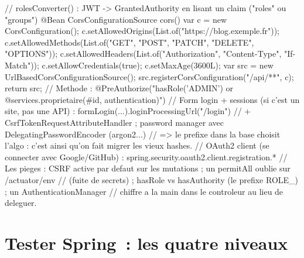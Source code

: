 \begin{codejava}
{    // rolesConverter() : JWT -> GrantedAuthority en lisant un claim ("roles" ou "groups")
    @Bean
    CorsConfigurationSource cors() {
        var c = new CorsConfiguration();
        c.setAllowedOrigins(List.of("https://blog.exemple.fr"));
        c.setAllowedMethods(List.of("GET", "POST", "PATCH", "DELETE", "OPTIONS"));
        c.setAllowedHeaders(List.of("Authorization", "Content-Type", "If-Match"));
        c.setAllowCredentials(true); c.setMaxAge(3600L);
        var src = new UrlBasedCorsConfigurationSource(); src.registerCorsConfiguration("/api/**", c); return src;
    }
}
// Methode : @PreAuthorize("hasRole('ADMIN') or @services.proprietaire(#id, authentication)")
// Form login + sessions (si c'est un site, pas une API) : formLogin(...).loginProcessingUrl("/login")
//   + CsrfTokenRequestAttributeHandler ; password manager avec DelegatingPasswordEncoder ({argon2}...)
//   => le prefixe dans la base choisit l'algo : c'est ainsi qu'on fait migrer les vieux hashes.
// OAuth2 client (se connecter avec Google/GitHub) : spring.security.oauth2.client.registration.*
// Les pieges : CSRF active par defaut sur les mutations ; un permitAll oublie sur /actuator/env
//   (fuite de secrets) ; hasRole vs hasAuthority (le prefixe ROLE_) ; un AuthenticationManager
//   chiffre a la main dans le controleur au lieu de deleguer.
\end{codejava}

\section{Tester Spring~: les quatre niveaux}

